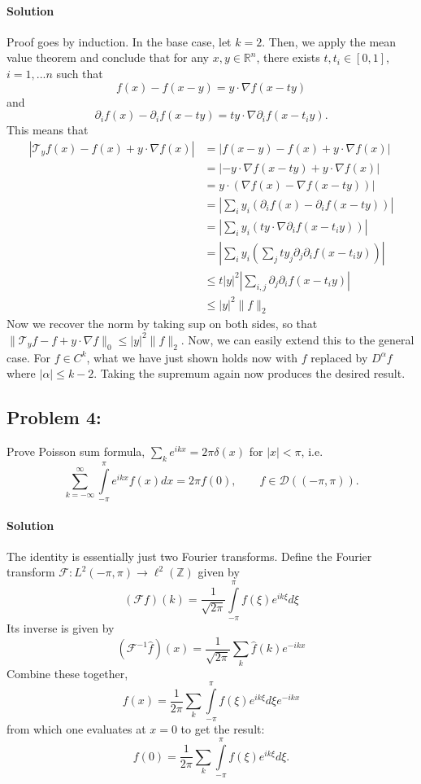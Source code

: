 \documentclass[letterpaper,twoside,11pt]{article}
\theoremstyle{mystyle}
\newcommand{\R}{{\mathbb R}}
\newcommand{\Z}{{\mathbb Z}}
\begin{document}
\paragraph*{Solution} Proof goes by induction. In the base case, let $k = 2$. Then, we apply the mean value theorem and conclude that for any $x, y \in \R^n$, there exists $t, t_i \in [0,1]$, $i = 1,...n$ such that
\[f(x) - f(x-y) = y\cdot \nabla f(x-ty)\]
and 
\[\partial_i f(x) - \partial_i f(x-ty) = ty\cdot \nabla\partial_i f(x-t_i y).\] This means that 
\begin{align*}
  |\mathcal T_y f(x) - f(x) + y\cdot\nabla f(x)| &= |f(x-y) - f(x) + y\cdot \nabla f(x)| \\
  &= |-y\cdot \nabla f(x-ty) + y\cdot \nabla f(x) | \\
  &= y\cdot (\nabla f(x) - \nabla f(x-ty))| \\
  &= \left\vert \sum_i y_i (\partial_i f(x) - \partial_i f(x-ty))\right\vert \\
  &=  \left\vert \sum_i y_i (ty\cdot \nabla \partial _i f(x-t_i y))\right\vert \\
  &= \left\vert \sum_i y_i \left( \sum_j ty_j\partial_j\partial_i f(x-t_iy)\right)\right\vert \\
  &\leq t |y|^2 \left\vert \sum_{i,j}\partial_j\partial_i f(x-t_iy) \right\vert \\
  &\leq |y|^2 \|f\|_2 
\end{align*} 
Now we recover the norm by taking sup on both sides, so that $\|\mathcal T_yf - f + y\cdot \nabla f\|_0 \leq |y|^2 \|f\|_2$. Now, we can easily extend this to the general case. For $f \in C^k$, what we have just shown holds now with $f$ replaced by $D^\alpha f$ where $|\alpha|\leq k-2$. Taking the supremum again now produces the desired result. 






\subsection*{Problem 4:} Prove Poisson sum formula, $\sum_k e^{ikx} = 2\pi \delta(x)$ for $|x|< \pi$, i.e. 
\[\sum_{k=-\infty}^\infty \int\limits_{-\pi}^\pi e^{ikx} f(x) dx = 2\pi f(0), \qquad f\in \mathcal D((-\pi, \pi)).\]

\paragraph*{Solution} The identity is essentially just two Fourier transforms. Define the Fourier transform $\mathcal F : L^2(-\pi, \pi) \to \ell^2(\Z) $ given by \[(\mathcal F f)(k) = \frac{1}{\sqrt{2\pi}}\int\limits_{-\pi}^\pi f(\xi) e^{ik\xi }d\xi\]
Its inverse is given by 
\[(\mathcal F^{-1} \hat f)(x) = \frac{1}{\sqrt{2\pi}}\sum_k \hat f(k) e^{-ikx}\]
Combine these together, 
\[f(x) = \frac{1}{2\pi}\sum_k \int\limits_{-\pi}^\pi f(\xi) e^{ik\xi}d\xi e^{-ikx}\]
from which one evaluates at $x=0$ to get the result:
\[f(0) = \frac{1}{2\pi}\sum_k \int\limits_{-\pi}^\pi f(\xi) e^{ik\xi}d\xi .\]
\end{document}
